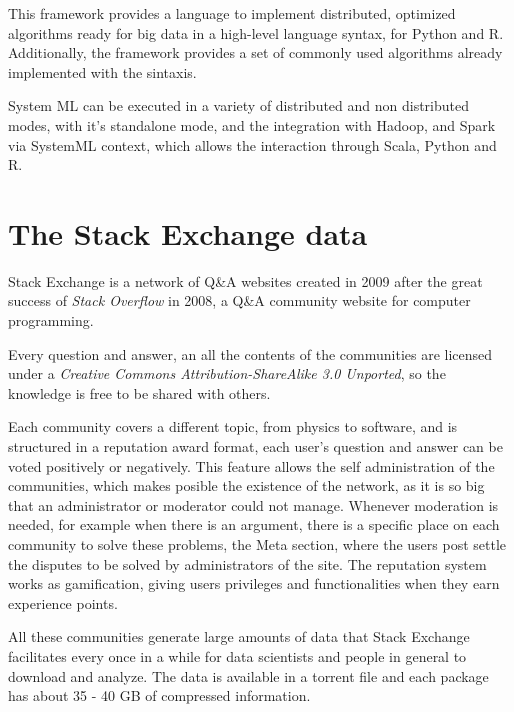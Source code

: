 \documentclass[11pt]{book} %
\begin{document}
    This framework provides a language to implement distributed, optimized algorithms ready for big data in a high-level language syntax, for Python and R. Additionally, the framework provides a set of commonly used algorithms already implemented with the sintaxis.

    System ML can be executed in a variety of distributed and non distributed modes, with it's standalone mode, and the integration with Hadoop, and Spark via SystemML context, which allows the interaction through Scala, Python and R.


  \section{The Stack Exchange data}
  \label{subsec:data_structure}


    Stack Exchange is a network of Q\&A websites created in 2009 after the great success of \emph{Stack Overflow} in 2008, a Q\&A community website for computer programming.

    Every question and answer, an all the contents of the communities are licensed under a \emph{Creative Commons Attribution-ShareAlike 3.0 Unported}, so the knowledge is free to be shared with others.

    Each community covers a different topic, from physics to software, and is structured in a reputation award format, each user's question and answer can be voted positively or negatively. This feature allows the self administration of the communities, which makes posible the existence of the network, as it is so big that an administrator or moderator could not manage. Whenever moderation is needed, for example when there is an argument, there is a specific place on each community to solve these problems, the Meta section, where the users post settle the disputes to be solved by administrators of the site. The reputation system works as gamification, giving users privileges and functionalities when they earn experience points.

    All these communities generate large amounts of data that Stack Exchange facilitates every once in a while for data scientists and people in general to download and analyze. The data is available in a torrent file and each package has about 35 - 40 GB of compressed information.
\end{document}
